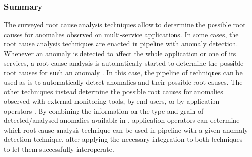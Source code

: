 \subsubsection{Summary}
\label{sec:rca:discussion:summary}
The surveyed root cause analysis techniques allow to determine the possible root causes for anomalies observed on multi-service applications.
In some cases, the root cause analysis techniques are enacted in pipeline with anomaly detection.
Whenever an anomaly is detected to affect the whole application or one of its services, a root cause analysis is automatically started to determine the possible root causes for such an anomaly  \cite{16_Liu2020_TraceAnomaly,49_Shan2019_epsilonDiagnosis,20_Wang2020_RootCauseMetricLocation,04_Wu2020_MicroRCA,09_Wu2020_MicroserviceDiagnosisDeepLearning,14_Samir2019_DLA,40_Chen2020_CauseInfer,48_Chen2014_CauseInfer,06_Lin2018_Microscope,19_Guan2019_MicroscopeDemo,29_Wang2018_CloudRanger,13_Mariani2018_LocalizingFaultsCloudSystems}.
{%
In this case, the pipeline of techniques can be used as-is to automatically detect anomalies and their possible root causes.
}
The other techniques instead determine the possible root causes for anomalies observed with external monitoring tools, by end users, or by application operators \cite{10_Aggarwal2020_FaultsGoldenSignals,01_Zhou2021_FaultAnalysisDebuggingMicroservices,45_Guo2020_GMTA,41_Mi2013_PerformanceDiagnosisCloud,21_Kim2013_RootCauseDetectionSOA,47_Liu2021_MicroHECL,42_Nguyen2011_PAL,43_Nguyen2013_FChain,30_Thalheim2017_Sieve,11_Brandon2020_GraphBasedRootCauseAnalysis,07_Ma2019_MSRank,25_Ma2020_MSRankExtended,08_Ma2020_AutoMAP,44_Lin2018_FacGraph,05_Meng2020_RootCausesMicroservices,46_Qiu2020_CausalityMiningKnowledgeGraph}.
{%
By combining the information on the type and grain of detected/analysed anomalies available in , application operators can determine which root cause analysis technique can be used in pipeline with a given anomaly detection technique, after applying the necessary integration to both techniques to let them successfully interoperate.
}

%


